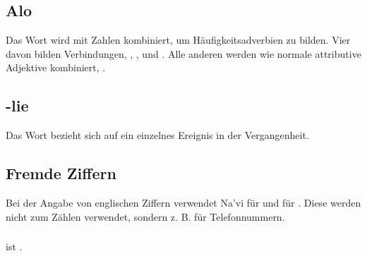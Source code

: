 \subsection{Alo} Das Wort   wird mit Zahlen kombiniert, um Häufigkeitsadverbien zu bilden. Vier davon bilden Verbindungen,  ,  ,   und  . Alle anderen werden wie normale attributive Adjektive kombiniert,  . 

\subsection{-lie} Das Wort  bezieht sich auf ein einzelnes Ereignis in der Vergangenheit. 

\subsection{Fremde Ziffern} Bei der Angabe von englischen Ziffern verwendet Na'vi  für  und  für . Diese werden nicht zum Zählen verwendet, sondern z. B. für Telefonnummern. 

\subsubsection{}  ist . 

